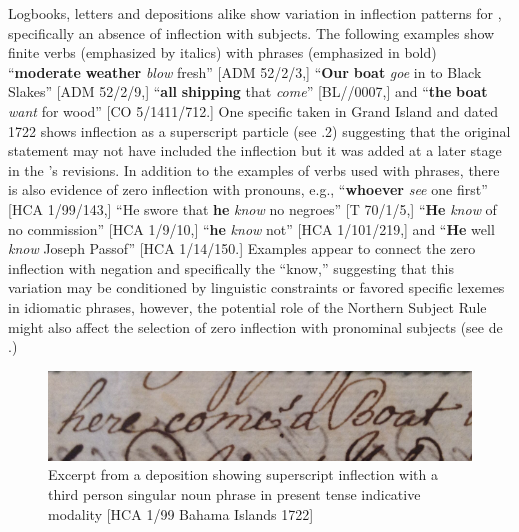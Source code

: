   Logbooks, letters and depositions alike show variation in inflection patterns for  , specifically an absence of inflection with  subjects. The following examples show  finite verbs (emphasized by italics) with   phrases (emphasized in bold) “\textbf{moderate} \textbf{weather} \textit{blow} fresh” [ADM 52/2/3,] “\textbf{Our} \textbf{boat} \textit{goe} in to Black Slakes” [ADM 52/2/9,] “\textbf{all} \textbf{shipping} that \textit{come}” [BL/\citealt{Egerton2395}/0007,] and “\textbf{the} \textbf{boat} \textit{want} for wood” [CO 5/1411/712.] One specific  taken in Grand  Island and dated 1722 shows inflection as a superscript particle (see .2) suggesting that the original statement may not have included the inflection but it was added at a later stage in the ’s revisions. In addition to the examples of verbs used with   phrases, there is also evidence of zero inflection with  pronouns, e.g., “\textbf{whoever} \textit{see} one first” [HCA 1/99/143,] “He swore that \textbf{he} \textit{know} no negroes” [T 70/1/5,] “\textbf{He} \textit{know} of no commission” [HCA 1/9/10,] “\textbf{he} \textit{know} not” [HCA 1/101/219,] and “\textbf{He} well \textit{know} Joseph Passof” [HCA 1/14/150.] Examples appear to connect the zero inflection with negation and specifically the  “know,” suggesting that this variation may be conditioned by linguistic constraints or favored specific lexemes in idiomatic phrases, however, the potential role of the Northern Subject Rule might also affect the selection of zero inflection with  pronominal subjects (see de \citealt{Haas2006}.) 

 
\begin{figure} 
\includegraphics[width=\textwidth]{figures/delgado-img16.png}

\caption{\label{fig:key:6.2} Excerpt from a deposition showing superscript inflection with a third person singular noun phrase in present tense indicative modality [HCA 1/99 Bahama {Islands 1722}]}
\end{figure}


